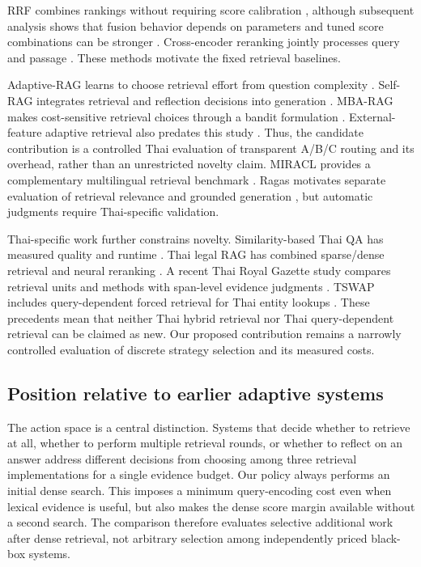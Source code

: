 \documentclass[10pt,a4paper]{article}
\begin{document}
RRF combines rankings without requiring score calibration \citep{ref4},
although subsequent analysis shows that fusion behavior depends on
parameters and tuned score combinations can be stronger \citep{ref5}.
Cross-encoder reranking jointly processes query and passage
\citep{ref6}. These methods motivate the fixed retrieval baselines.

Adaptive-RAG learns to choose retrieval effort from question complexity
\citep{ref7}. Self-RAG integrates retrieval and reflection decisions
into generation \citep{ref8}. MBA-RAG makes cost-sensitive retrieval
choices through a bandit formulation \citep{ref9}. External-feature
adaptive retrieval also predates this study \citep{ref10}. Thus, the
candidate contribution is a controlled Thai evaluation of transparent
A/B/C routing and its overhead, rather than an unrestricted novelty
claim. MIRACL provides a complementary multilingual retrieval benchmark
\citep{ref11}. Ragas motivates separate evaluation of retrieval
relevance and grounded generation \citep{ref12}, but automatic judgments
require Thai-specific validation.

Thai-specific work further constrains novelty. Similarity-based Thai QA
has measured quality and runtime \citep{ref13}. Thai legal RAG has
combined sparse/dense retrieval and neural reranking \citep{ref14}. A
recent Thai Royal Gazette study compares retrieval units and methods
with span-level evidence judgments \citep{ref15}. TSWAP includes
query-dependent forced retrieval for Thai entity lookups \citep{ref16}.
These precedents mean that neither Thai hybrid retrieval nor Thai
query-dependent retrieval can be claimed as new. Our proposed
contribution remains a narrowly controlled evaluation of discrete
strategy selection and its measured costs.

\hypertarget{position-relative-to-earlier-adaptive-systems}{%
\subsection{Position relative to earlier adaptive
systems}\label{position-relative-to-earlier-adaptive-systems}}

The action space is a central distinction. Systems that decide whether
to retrieve at all, whether to perform multiple retrieval rounds, or
whether to reflect on an answer address different decisions from
choosing among three retrieval implementations for a single evidence
budget. Our policy always performs an initial dense search. This imposes
a minimum query-encoding cost even when lexical evidence is useful, but
also makes the dense score margin available without a second search. The
comparison therefore evaluates selective additional work after dense
retrieval, not arbitrary selection among independently priced black-box
systems.
\end{document}
